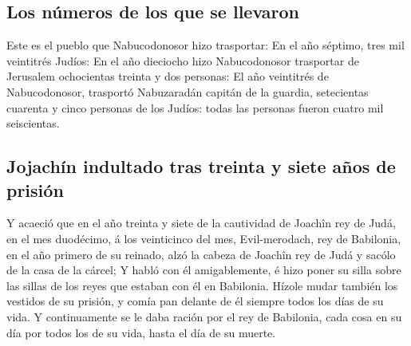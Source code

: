 \hypertarget{los-nuxfameros-de-los-que-se-llevaron}{%
\subsection{Los números de los que se
llevaron}\label{los-nuxfameros-de-los-que-se-llevaron}}

 Este es el pueblo que Nabucodonosor hizo trasportar: En el
año séptimo, tres mil veintitrés Judíos:  En el año
dieciocho hizo Nabucodonosor trasportar de Jerusalem ochocientas treinta
y dos personas:  El año veintitrés de Nabucodonosor,
trasportó Nabuzaradán capitán de la guardia, setecientas cuarenta y
cinco personas de los Judíos: todas las personas fueron cuatro mil
seiscientas.

\hypertarget{jojachuxedn-indultado-tras-treinta-y-siete-auxf1os-de-prisiuxf3n}{%
\subsection{Jojachín indultado tras treinta y siete años de
prisión}\label{jojachuxedn-indultado-tras-treinta-y-siete-auxf1os-de-prisiuxf3n}}

 Y acaeció que en el año treinta y siete de la cautividad
de Joachîn rey de Judá, en el mes duodécimo, á los veinticinco del mes,
Evil-merodach, rey de Babilonia, en el año primero de su reinado, alzó
la cabeza de Joachîn rey de Judá y sacólo de la casa de la cárcel;
 Y habló con él amigablemente, é hizo poner su silla sobre
las sillas de los reyes que estaban con él en Babilonia. 
Hízole mudar también los vestidos de su prisión, y comía pan delante de
él siempre todos los días de su vida.  Y continuamente se
le daba ración por el rey de Babilonia, cada cosa en su día por todos
los de su vida, hasta el día de su muerte.
